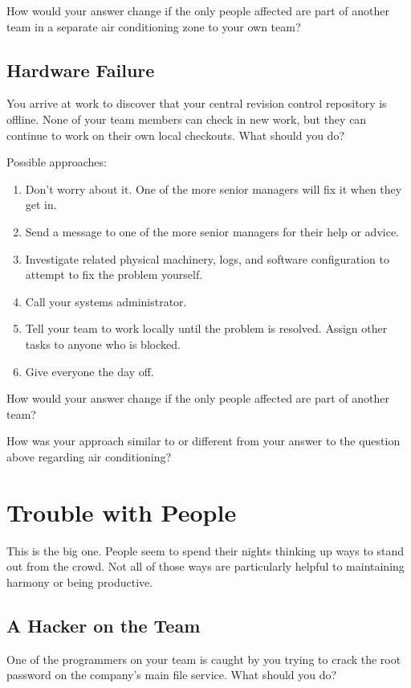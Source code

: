 How would your answer change if the only people affected are part of another team in a separate air conditioning zone to your own team?


\subsection{Hardware Failure}

You arrive at work to discover that your central revision control repository is offline. None of your team members can check in new work, but they can continue to work on their own local checkouts. What should you do?

Possible approaches:

\begin{enumerate}
\item Don't worry about it. One of the more senior managers will fix it when they get in.
\item Send a message to one of the more senior managers for their help or advice.
\item Investigate related physical machinery, logs, and software configuration to attempt to fix the problem yourself.
\item Call your systems administrator.
\item Tell your team to work locally until the problem is resolved. Assign other tasks to anyone who is blocked.
\item Give everyone the day off.
\end{enumerate}

How would your answer change if the only people affected are part of another team?

How was your approach similar to or different from your answer to the question above regarding air conditioning?


\section{Trouble with People}

This is the big one. People seem to spend their nights thinking up ways to stand out from the crowd. Not all of those ways are particularly helpful to maintaining harmony or being productive.

\subsection{A Hacker on the Team}

One of the programmers on your team is caught by you trying to crack the root password on the company's main file service. What should you do?

